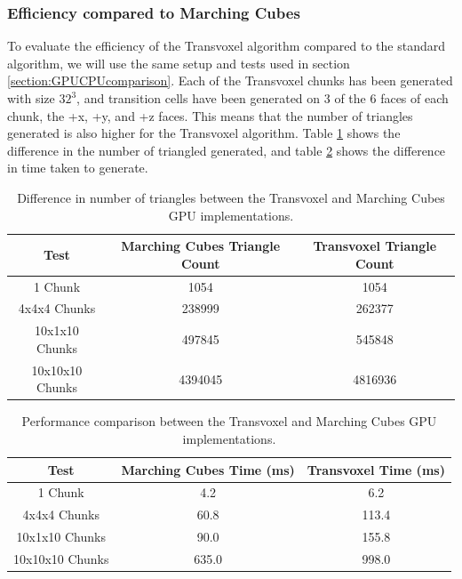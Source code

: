 \documentclass{article}
\begin{document}
\subsubsection{Efficiency compared to Marching Cubes}

To evaluate the efficiency of the Transvoxel algorithm compared to the standard algorithm, we will use the same setup and tests used in section \ref{section:GPUCPUcomparison}. Each of the Transvoxel chunks has been generated with size $32^3$, and transition cells have been generated on 3 of the 6 faces of each chunk, the +x, +y, and +z faces. This means that the number of triangles generated is also higher for the Transvoxel algorithm. Table \ref{tab:gpu-tv-comparison-tris} shows the difference in the number of triangled generated, and table \ref{tab:gpu-tv-comparison-time} shows the difference in time taken to generate.

\begin{table}[H]
  \begin{tabular}{|c|c|c|}
    \hline
    Test & Marching Cubes Triangle Count & Transvoxel Triangle Count\\
    \hline
    \hline
    1 Chunk & 1054 & 1054\\
    4x4x4 Chunks & 238999 & 262377\\
    10x1x10 Chunks & 497845 & 545848\\
    10x10x10 Chunks & 4394045 & 4816936\\
    \hline
  \end{tabular}
  \caption{\label{tab:gpu-tv-comparison-tris}Difference in number of triangles between the Transvoxel and Marching Cubes GPU implementations.}
\end{table}

\begin{table}[H]
  \begin{tabular}{|c|c|c|}
    \hline
    Test & Marching Cubes Time (ms) & Transvoxel Time (ms) \\
    \hline
    \hline
    1 Chunk & 4.2 & 6.2\\
    4x4x4 Chunks & 60.8 & 113.4\\
    10x1x10 Chunks & 90.0 & 155.8\\
    10x10x10 Chunks & 635.0 & 998.0\\
    \hline
  \end{tabular}
  \caption{\label{tab:gpu-tv-comparison-time}Performance comparison between the Transvoxel and Marching Cubes GPU implementations.}
\end{table}
\end{document}
